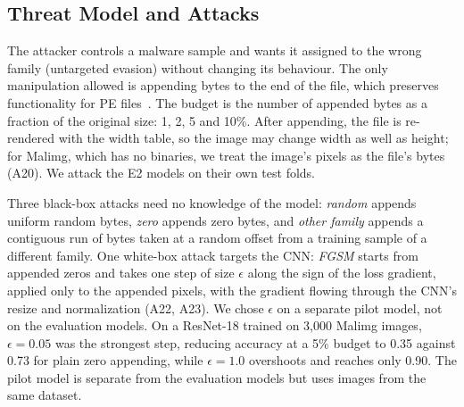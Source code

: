 \documentclass[conference]{IEEEtran}
\begin{document}
\subsection{Threat Model and Attacks}
The attacker controls a malware sample and wants it assigned to the wrong family
(untargeted evasion) without changing its behaviour. The only manipulation allowed is
appending bytes to the end of the file, which preserves functionality for PE
files~\cite{demetrio2021exemples,kolosnjaji2018adversarial}. The budget is the number
of appended bytes as a fraction of the original size: 1, 2, 5 and 10\%. After
appending, the file is re-rendered with the width table, so the image may change
width as well as height; for Malimg, which has no binaries, we treat the image's
pixels as the file's bytes (A20). We attack the E2 models on their own test folds.

Three black-box attacks need no knowledge of the model: \emph{random} appends uniform
random bytes, \emph{zero} appends zero bytes, and \emph{other family} appends a
contiguous run of bytes taken at a random offset from a training sample of a
different family. One white-box attack targets the CNN: \emph{FGSM} starts from
appended zeros and takes one step of size $\epsilon$ along the sign of the loss
gradient, applied only to the appended pixels, with the gradient flowing through the
CNN's resize and normalization (A22, A23). We chose $\epsilon$ on a separate pilot
model, not on the evaluation models.
On a ResNet-18 trained on 3,000 Malimg images, $\epsilon = 0.05$ was the strongest
step, reducing accuracy at a 5\% budget to 0.35 against 0.73 for
plain zero appending, while $\epsilon = 1.0$ overshoots and reaches only
0.90. The pilot model is separate from the evaluation models but uses images
from the same dataset.
\end{document}
